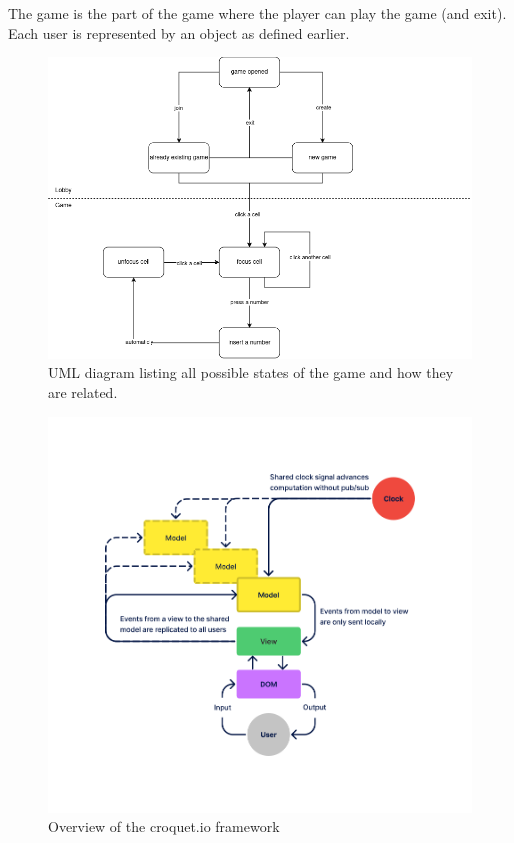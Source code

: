 \documentclass[12pt, a4paper]{report}
\begin{document}
The game is the part of the game where the player can play the game (and exit). Each user is represented by an object as defined earlier.

\begin{figure}
    \centering
    \includegraphics[scale=0.5]{part2a-states.png}
    \caption{UML diagram listing all possible states of the game and how they are related.}
\end{figure}

\begin{figure}
    \centering
    \includegraphics[scale=0.5]{croquet_overview.png}
    \caption{Overview of the croquet.io framework}
\end{figure}
\end{document}
